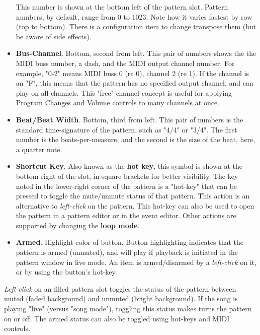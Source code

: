 \begin{itemize}
         This number is shown at the bottom left of the pattern slot.
         Pattern numbers, by default, range from 0 to 1023.
         Note how it varies fastest by row (top to bottom).
         There is a configuration item to change transpose them (but
         be aware of side effects).
      \item \textbf{Bus-Channel}. Bottom, second from left.
         This pair of numbers shows the the MIDI buss number, a dash, and
         the MIDI output channel number.
         For example, "0-2" means MIDI buss 0 (re 0), channel 2 (re 1).
         If the channel is an "F", this means that the pattern has no specified
         output channel, and can play on all channels.
         This "free" channel concept is useful for applying Program Changes and
         Volume controls to many channels at once.
      \item \textbf{Beat/Beat Width}. Bottom, third from left.
         This pair of numbers is the standard time-signature of the pattern,
         such as "4/4" or "3/4".  The first number is the beats-per-measure,
         and the second is the size of the beat, here, a quarter note.
      \item \textbf{Shortcut Key}.  Also known as the
         \textbf{hot key}, this symbol is shown at the bottom right of the
         slot, in square brackets for better visibility.
         The key noted in the lower-right corner of the pattern is a "hot-key"
         that can be pressed to toggle the mute/unmute status of that pattern.
         This action is an alternative to
         \textsl{left-click} on the pattern.
         This hot-key can also be used to open the pattern in a pattern editor
         or in the event editor.
         Other actions are supported by changing the 
         \textbf{loop mode}.
      \item \textbf{Armed}. Highlight color of button.
         Button highlighting indicates that the pattern is armed
         (unmuted), and will play if playback is initiated in the pattern
         window in live mode.
         An item is armed/disarmed by a
         \textsl{left-click} on it, or by using the
         button's hot-key.
   \end{itemize}

   \textsl{Left-click} on an filled pattern slot toggles the status of the
   pattern between muted (faded background) and unmuted (bright background).
   If the song is playing "live" (versus "song mode"), toggling this
   status makes turns the pattern on or off.  The armed status
   can also be toggled using hot-keys and MIDI controls.

